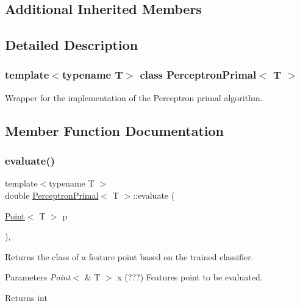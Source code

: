 \subsection*{Additional Inherited Members}


\subsection{Detailed Description}
\subsubsection*{template$<$typename T$>$\newline
class Perceptron\+Primal$<$ T $>$}

Wrapper for the implementation of the Perceptron primal algorithm. 

\subsection{Member Function Documentation}
\mbox{\label{class_perceptron_primal_a547d98d8d61480d5bc44fe759c3a8e28}} 
\subsubsection{\texorpdfstring{evaluate()}{evaluate()}}
{\footnotesize\ttfamily template$<$typename T $>$ \\
double \mbox{\hyperlink{class_perceptron_primal}{Perceptron\+Primal}}$<$ T $>$\+::evaluate (\begin{DoxyParamCaption}\item[{\mbox{\hyperlink{class_point}{Point}}$<$ T $>$}]{p }\end{DoxyParamCaption})\hspace{0.3cm}{\ttfamily [override]}, {\ttfamily [virtual]}}



Returns the class of a feature point based on the trained classifier. 


\begin{DoxyParams}{Parameters}
{\em Point$<$} & T $>$ x (???) Features point to be evaluated. \\
\hline
\end{DoxyParams}
\begin{DoxyReturn}{Returns}
int 
\end{DoxyReturn}


